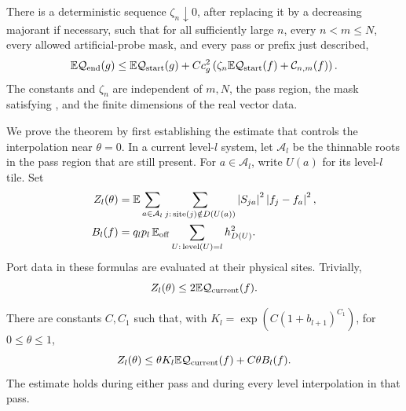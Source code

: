 \begin{theorem}
\label{hier:comparison}
There is a deterministic sequence $\zeta_n\downarrow0$, after replacing
it by a decreasing majorant if necessary, such that for all sufficiently
large $n$, every $n<m\le N$, every
allowed artificial-probe mask, and every pass or prefix just described,
\begin{equation}
 \mathbb E\mathcal Q_{\rm end}(g)
 \le \mathbb E\mathcal Q_{\rm start}(g)
       +C c_g^2\left(
          \zeta_n\mathbb E\mathcal Q_{\rm start}(f)
                    +\mathcal C_{n,m}(f)\right).
 \label{hier:comparison-equation}
\end{equation}
The constants and $\zeta_n$ are independent of $m,N$, the pass region,
the mask satisfying , and the finite dimensions
of the real vector data.
\end{theorem}

We prove the theorem by first establishing the estimate that controls
the interpolation near $\theta=0$.  In a current level-$l$ system, let
$\mathcal A_l$ be the thinnable roots in the pass region that are still
present.  For $a\in\mathcal A_l$, write $U(a)$ for its level-$l$ tile.
Set
\begin{align}
 Z_l(\theta)
  &=\mathbb E\sum_{a\in\mathcal A_l}
        \sum_{j:\,\operatorname{site}(j)\notin D(U(a))}
             \left\lvert S_{ja}\right\rvert^2\left\lvert f_j-f_a\right\rvert^2,
       \label{hier:exterior-mass}\\
 B_l(f)
  &=q_lp_l\,\mathbb E_{\rm off}
         \sum_{U:\,\operatorname{level}(U)=l}h_{D(U)}^2.
       \label{hier:level-charge}
\end{align}
Port data in these formulas are evaluated at their physical sites.
Trivially,
\begin{equation}
               Z_l(\theta)\le2\mathbb E\mathcal Q_{\rm current}(f).
 \label{hier:uncapped}
\end{equation}

\begin{lemma}
\label{hier:cap}
There are constants $C,C_1$ such that, with
$K_l=\exp(C(1+b_{l+1})^{C_1})$, for $0\le\theta\le1$,
\begin{equation}
 Z_l(\theta)
   \le\theta K_l\mathbb E\mathcal Q_{\rm current}(f)
                         +C\theta B_l(f).
 \label{hier:cap-equation}
\end{equation}
The estimate holds during either pass and during every level
interpolation in that pass.
\end{lemma}

